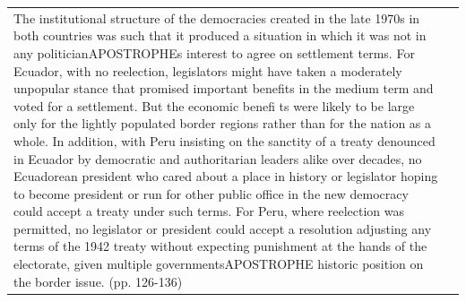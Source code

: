 {\begin{longtable}{p{}p{}}
The institutional structure of the democracies created in the late 1970s in both countries was such that it produced a situation in which it was not in any politicianAPOSTROPHEs interest to agree on settlement terms. For Ecuador, with no reelection, legislators might have taken a moderately unpopular stance that promised important benefits in the medium term and voted for a settlement. But the economic benefi ts were likely to be large only for the lightly populated border regions rather than for the nation as a whole. In addition, with Peru insisting on the sanctity of a treaty denounced in Ecuador by democratic and authoritarian leaders alike over decades, no Ecuadorean president who cared about a place in history or legislator hoping to become president or run for other public office in the new democracy could accept a treaty under such terms. For Peru, where reelection was permitted, no legislator or president could accept a resolution adjusting any terms of the 1942 treaty without expecting punishment at the hands of the electorate, given multiple governmentsAPOSTROPHE historic position on the border issue. (pp. 126-136)


\end{longtable}}
